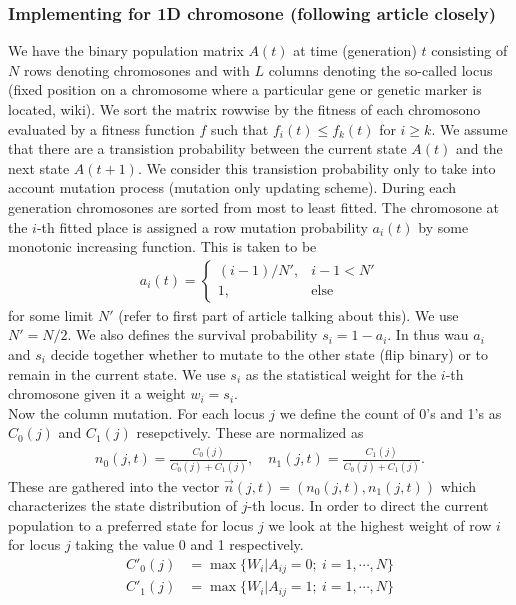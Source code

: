 \subsubsection{Implementing for 1D chromosone (following article closely)}

We have the binary population matrix $A(t)$ at time (generation) $t$ consisting of $N$ rows denoting chromosones and with $L$ columns denoting the so-called locus (fixed position on a chromosome where a particular gene or genetic marker is located, wiki). We sort the matrix rowwise by the fitness of each chromosono evaluated by a fitness function $f$ such that $f_i(t) \le f_k(t)$ for $i \ge k$. We assume that there are a transistion probability between the current state $A(t)$ and the next state $A(t+1)$. We consider this transistion probability only to take into account mutation process (mutation only updating scheme). During each generation chromosones are sorted from most to least fitted. The chromosone at the $i$-th fitted place is assigned a row mutation probability $a_i(t)$ by some monotonic increasing function. This is taken to be 
\begin{align*}
  a_i(t) = 
  \begin{cases}
    (i-1)/N',& i-1 < N' \\
    1, &\text{else}
  \end{cases}
\end{align*}
for some limit $N'$ (refer to first part of article talking about this). We use $N' = N/2$. We also defines the survival probability $s_i = 1 - a_i$. In thus wau $a_i$ and $s_i$ decide together whether to mutate to the other state (flip binary) or to remain in the current state. We use $s_i$ as the statistical weight for the $i$-th chromosone given it a weight $w_i = s_i$.
\\
Now the column mutation. For each locus $j$ we define the count of 0's and 1's as $C_0(j)$ and $C_1(j)$ resepctively. These are normalized as
\begin{align*}
  n_0(j, t) = \frac{C_0(j)}{C_0(j) + C_1(j)}, \quad n_1(j, t) = \frac{C_1(j)}{C_0(j) + C_1(j)}.
\end{align*}
These are gathered into the vector $\vec{n}(j,t)=(n_0(j, t), n_1(j, t))$ which characterizes the state distribution of $j$-th locus. In order to direct the current population to a preferred state for locus $j$ we look at the highest weight of row $i$ for locus $j$ taking the value 0 and 1 respectively.
\begin{align*}
  C'_0(j) &= \max\{W_i | A_{ij} = 0; \ i = 1, \cdots, N\} \\
  C'_1(j) &= \max\{W_i | A_{ij} = 1; \ i = 1, \cdots, N\}
\end{align*}
